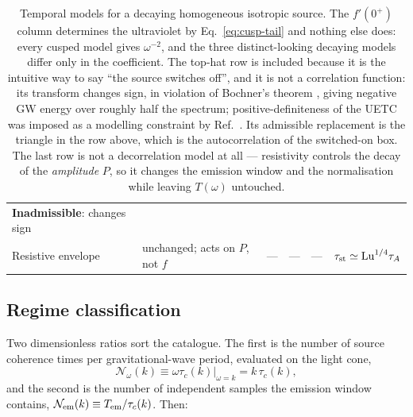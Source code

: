 \documentclass[10pt,prd,aps,nobibnotes,superscriptaddress,preprintnumbers,notitlepage]{revtex4-1}
\begin{document}
\begin{table}[ht]
\begin{tabular}{@{}p{} p{} p{} p{} p{} p{}@{}}
    \textbf{Inadmissible}: changes sign \\
  Resistive envelope &
    unchanged; acts on $P$, not $f$ & --- & --- & --- &
    $\tau_{\rm st}\simeq{\rm Lu}^{1/4}\tau_A$ \cite{Brandenburg:2024tyi} \\
  \hline\hline
  \end{tabular}
  \caption{Temporal models for a decaying homogeneous isotropic source. The
  $f'(0^{+})$ column determines the ultraviolet by Eq.~\eqref{eq:cusp-tail} and
  nothing else does: every cusped model gives $\omega^{-2}$, and the three
  distinct-looking decaying models differ only in the coefficient. The top-hat
  row is included because it is the intuitive way to say ``the source switches
  off'', and it is not a correlation function: its transform changes sign, in
  violation of Bochner's theorem \cite{MoninYaglom:1975}, giving negative GW energy
  over roughly half the spectrum; positive-definiteness of the UETC was imposed as
  a modelling constraint by Ref.~\cite{Auclair:2022jod}. Its admissible replacement is the triangle in the row above, which is
  the autocorrelation of the switched-on box. The last row is not a
  decorrelation model at all --- resistivity controls the decay of the
  \emph{amplitude} $P$, so it changes the emission window and the normalisation
  while leaving $T(\omega)$ untouched.}
  \label{tab:temporal-catalogue}
\end{table}

\subsection{Regime classification}
\label{sec:temporal-regimes-class}

Two dimensionless ratios sort the catalogue. The first is the number of source
coherence times per gravitational-wave period, evaluated on the light cone,
\begin{equation}
  \mathcal{N}_\omega(k)\equiv\omega\tau_c(k)\big|_{\omega=k}=k\,\tau_c(k),
  \label{eq:coherence-number}
\end{equation}
and the second is the number of independent samples the emission window contains,
$\mathcal{N}_{\rm em}(k)\equiv T_{\rm em}/\tau_c(k)$. Then:
\end{document}
